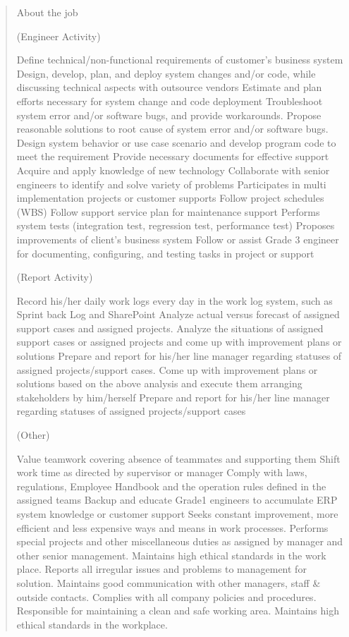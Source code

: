 \documentclass[
	letterpaper, %
	12pt, %
]{CSSullivanBusinessReport}
\begin{document}
\begin{quote}
	About the job
	
	(Engineer Activity)

    Define technical/non-functional requirements of customer's business system
    Design, develop, plan, and deploy system changes and/or code, while discussing technical aspects with outsource vendors
    Estimate and plan efforts necessary for system change and code deployment
    Troubleshoot system error and/or software bugs, and provide workarounds.
    Propose reasonable solutions to root cause of system error and/or software bugs.
    Design system behavior or use case scenario and develop program code to meet the requirement
    Provide necessary documents for effective support
    Acquire and apply knowledge of new technology
    Collaborate with senior engineers to identify and solve variety of problems
    Participates in multi implementation projects or customer supports
    Follow project schedules (WBS)
    Follow support service plan for maintenance support
    Performs system tests (integration test, regression test, performance test)
    Proposes improvements of client's business system
    Follow or assist Grade 3 engineer for documenting, configuring, and testing tasks in project or support


	(Report Activity)

    Record his/her daily work logs every day in the work log system, such as Sprint back Log and SharePoint
    Analyze actual versus forecast of assigned support cases and assigned projects.
    Analyze the situations of assigned support cases or assigned projects and come up with improvement plans or solutions
    Prepare and report for his/her line manager regarding statuses of assigned projects/support cases.
    Come up with improvement plans or solutions based on the above analysis and execute them arranging stakeholders by him/herself
    Prepare and report for his/her line manager regarding statuses of assigned projects/support cases


	(Other)

    Value teamwork covering absence of teammates and supporting them
    Shift work time as directed by supervisor or manager
    Comply with laws, regulations, Employee Handbook and the operation rules defined in the assigned teams
    Backup and educate Grade1 engineers to accumulate ERP system knowledge or customer support
    Seeks constant improvement, more efficient and less expensive ways and means in work processes.
    Performs special projects and other miscellaneous duties as assigned by manager and other senior management.
    Maintains high ethical standards in the work place.
    Reports all irregular issues and problems to management for solution.
    Maintains good communication with other managers, staff \& outside contacts.
    Complies with all company policies and procedures.
    Responsible for maintaining a clean and safe working area.
    Maintains high ethical standards in the workplace.


\end{quote}
\end{document}
